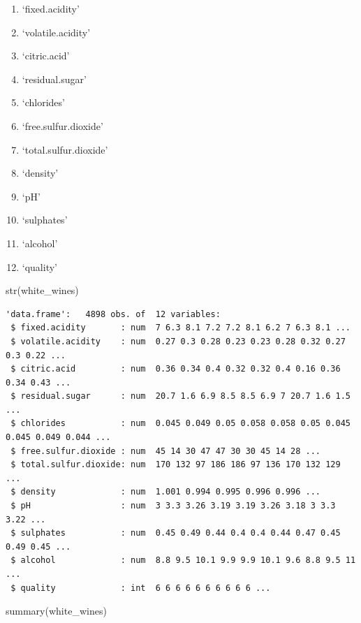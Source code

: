 \documentclass[
  letterpaper,
  DIV=11,
  numbers=noendperiod]{scrreprt}
\newenvironment{Shaded}{\begin{snugshade}}{\end{snugshade}}
\newcommand{\FunctionTok}[1]{\textcolor[rgb]{0.28,0.35,0.67}{#1}}
\newcommand{\NormalTok}[1]{\textcolor[rgb]{0.00,0.23,0.31}{#1}}
\providecommand{\tightlist}{%
  \setlength{\itemsep}{0pt}\setlength{\parskip}{0pt}}\usepackage{longtable,booktabs,array}
\begin{document}
\begin{enumerate}
\def\labelenumi{\arabic{enumi}.}
\tightlist
\item
  `fixed.acidity'
\item
  `volatile.acidity'
\item
  `citric.acid'
\item
  `residual.sugar'
\item
  `chlorides'
\item
  `free.sulfur.dioxide'
\item
  `total.sulfur.dioxide'
\item
  `density'
\item
  `pH'
\item
  `sulphates'
\item
  `alcohol'
\item
  `quality'
\end{enumerate}

\begin{Shaded}
\begin{Highlighting}[]
\FunctionTok{str}\NormalTok{(white\_wines)}
\end{Highlighting}
\end{Shaded}

\begin{verbatim}
'data.frame':   4898 obs. of  12 variables:
 $ fixed.acidity       : num  7 6.3 8.1 7.2 7.2 8.1 6.2 7 6.3 8.1 ...
 $ volatile.acidity    : num  0.27 0.3 0.28 0.23 0.23 0.28 0.32 0.27 0.3 0.22 ...
 $ citric.acid         : num  0.36 0.34 0.4 0.32 0.32 0.4 0.16 0.36 0.34 0.43 ...
 $ residual.sugar      : num  20.7 1.6 6.9 8.5 8.5 6.9 7 20.7 1.6 1.5 ...
 $ chlorides           : num  0.045 0.049 0.05 0.058 0.058 0.05 0.045 0.045 0.049 0.044 ...
 $ free.sulfur.dioxide : num  45 14 30 47 47 30 30 45 14 28 ...
 $ total.sulfur.dioxide: num  170 132 97 186 186 97 136 170 132 129 ...
 $ density             : num  1.001 0.994 0.995 0.996 0.996 ...
 $ pH                  : num  3 3.3 3.26 3.19 3.19 3.26 3.18 3 3.3 3.22 ...
 $ sulphates           : num  0.45 0.49 0.44 0.4 0.4 0.44 0.47 0.45 0.49 0.45 ...
 $ alcohol             : num  8.8 9.5 10.1 9.9 9.9 10.1 9.6 8.8 9.5 11 ...
 $ quality             : int  6 6 6 6 6 6 6 6 6 6 ...
\end{verbatim}

\begin{Shaded}
\begin{Highlighting}[]
\FunctionTok{summary}\NormalTok{(white\_wines)}
\end{Highlighting}
\end{Shaded}
\end{document}
